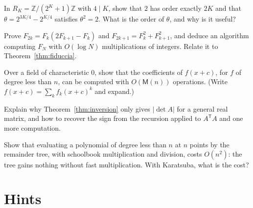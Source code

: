 \begin{exercise}[$\star$]\label{ex:sqrt2}
In $R_K=\mathbb Z/(2^K+1)\mathbb Z$ with $4\mid K$, show that $2$ has order exactly $2K$ and that $\theta=2^{3K/4}-2^{K/4}$ satisfies $\theta^2=2$. What is the order of $\theta$, and why is it useful?
\end{exercise}

\begin{exercise}[$\star$]\label{ex:fibdouble}
Prove $F_{2k}=F_k(2F_{k+1}-F_k)$ and $F_{2k+1}=F_k^2+F_{k+1}^2$, and deduce an algorithm computing $F_N$ with $O(\log N)$ multiplications of integers. Relate it to Theorem~\ref{thm:fiduccia}.
\end{exercise}

\begin{exercise}[$\star\star$]\label{ex:taylorshift}
Over a field of characteristic $0$, show that the coefficients of $f(x+c)$, for $f$ of degree less than $n$, can be computed with $O(\mathsf M(n))$ operations. (Write $f(x+c)=\sum_kf_k(x+c)^k$ and expand.)
\end{exercise}

\begin{exercise}[$\star$]\label{ex:detabs}
Explain why Theorem~\ref{thm:inversion} only gives $|\det A|$ for a general real matrix, and how to recover the sign from the recursion applied to $A^{\mathsf T}A$ and one more computation.
\end{exercise}

\begin{exercise}[$\star\star$]\label{ex:remtree}
Show that evaluating a polynomial of degree less than $n$ at $n$ points by the remainder tree, with schoolbook multiplication and division, costs $O(n^2)$: the tree gains nothing without fast multiplication. With Karatsuba, what is the cost?
\end{exercise}

\section{Hints}

